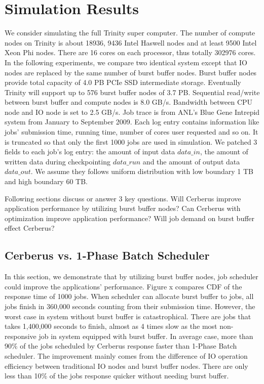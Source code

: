 \section{Simulation Results}
We consider simulating the full Trinity super computer.
The number of compute nodes on Trinity is about 18936, 9436 Intel Haswell nodes
and at least 9500 Intel Xeon Phi nodes.
There are 16 cores on each processor, thus totally 302976 cores.
In the following experiments, we compare two identical system except that
IO nodes are replaced by the same number of burst buffer nodes.
Burst buffer nodes provide total capacity of 4.0 PB PCIe SSD intermediate storage.
Eventually Trinity will support up to 576 burst buffer nodes of 3.7 PB.
Sequential read/write between burst buffer and compute nodes is 8.0 GB/s.
Bandwidth between CPU node and IO node is set to 2.5 GB/s.
Job trace is from ANL's Blue Gene Intrepid system from January to September 2009.
Each log entry contains information like jobs' submission time, running time,
number of cores user requested and so on. 
It is truncated so that only the first 1000 jobs are used in simulation.
We patched 3 fields to each job's log entry: the amount of input data $data\_in$,
the amount of written data during checkpointing $data\_run$ and the amount of output data $data\_out$.
We assume they follows uniform distribution with low boundary 1 TB and high boundary 60 TB.

Following sections discuss or answer 3 key questions.
Will Cerberus improve application performance by utilizing burst buffer nodes?
Can Cerberus with optimization improve application performance?
Will job demand on burst buffer effect Cerberus?

\subsection{Cerberus vs. 1-Phase Batch Scheduler}
\label{Sec:Sim:BBvsIO}
In this section, we demonstrate that by utilizing burst buffer nodes,
job scheduler could improve the applications' performance.
Figure x compares CDF of the response time of 1000 jobs.
When scheduler can allocate burst buffer to jobs,
all jobs finish in 360,000 seconds counting from their submission time.
However, the worst case in system without burst buffer is catastrophical.
There are jobs that takes 1,400,000 seconds to finish,
almost as 4 times slow as the most non-responsive job in system equipped with burst buffer.
In average case, more than 90\% of the jobs scheduled by Cerberus response faster than 1-Phase Batch scheduler.
The improvement mainly comes from the difference of IO operation efficiency between
traditional IO nodes and burst buffer nodes.
There are only less than 10\% of the jobs response quicker without needing burst buffer.



